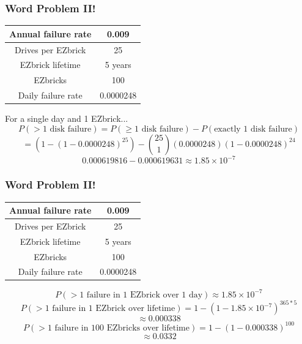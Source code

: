 \documentclass{beamer}
\theoremstyle{mystyle}
\begin{document}
\begin{frame}
\frametitle{Word Problem II!}

\begin{center}
	\begin{tabular}{ | c | c | }
		\hline Annual failure rate & 0.009 \\
		\hline Drives per EZbrick & 25 \\
		\hline EZbrick lifetime & 5 years \\
		\hline EZbricks & 100 \\
		\hline Daily failure rate & 0.0000248 \\
		\hline
	\end{tabular}
\end{center}

\begin{center}
For a single day and 1 EZbrick...
	\[P(>\text{1 disk failure}) = P( \geq \text{1 disk failure}) - P(\text{exactly 1 disk failure})  \]
\vspace*{-\baselineskip} \pause	\[ = (1 - (1 - 0.0000248)^{25}) - {25\choose 1}(0.0000248)(1 - 0.0000248)^{24}\]
\vspace*{-0.5\baselineskip} \pause\[0.000619816 - 0.000619631 \approx 1.85\times10^{-7} \]

\end{center}
	
\end{frame}


\begin{frame}
\frametitle{Word Problem II!}

\begin{center}
	\begin{tabular}{ | c | c | }
		\hline Annual failure rate & 0.009 \\
		\hline Drives per EZbrick & 25 \\
		\hline EZbrick lifetime & 5 years \\
		\hline EZbricks & 100 \\
		\hline Daily failure rate & 0.0000248 \\
		\hline
	\end{tabular}
\end{center}

\begin{center}
\[P( >1\text{ failure in 1 EZbrick over 1 day}) \approx 1.85 \times 10^{-7}\]
\vspace*{-0.5\baselineskip} \pause \[P( >1\text{ failure in 1 EZbrick over lifetime}) = 1 - (1 - 1.85\times 10^{-7})^{365*5} \]
\[ \approx 0.000338\]
\vspace*{-0.5\baselineskip} \pause\[ P( > 1 \text{ failure in 100 EZbricks over lifetime}) = 1 - (1 - 0.000338)^{100} \]
\[\approx 0.0332 \]
\end{center}

\end{frame}
\end{document}
